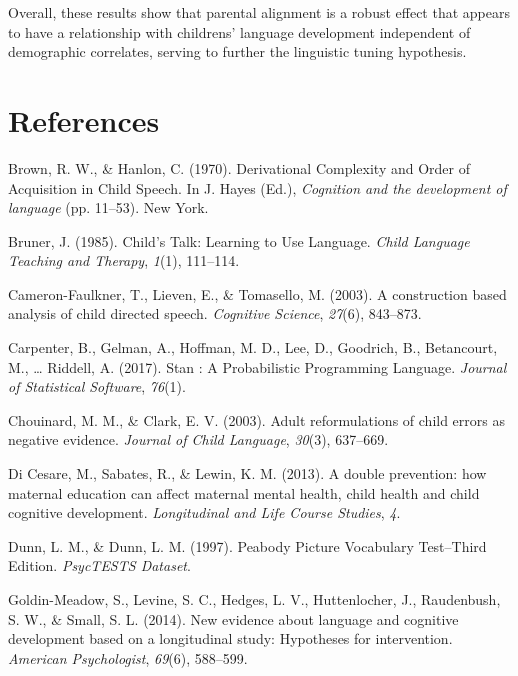 \documentclass[10pt, letterpaper]{article}
\begin{document}
Overall, these results show that parental alignment is a robust effect
that appears to have a relationship with childrens' language development
independent of demographic correlates, serving to further the linguistic
tuning hypothesis.

\hypertarget{references}{%
\section{References}\label{references}}

\setlength{\parindent}{-0.1in} 
\setlength{\leftskip}{0.125in}

\noindent

\hypertarget{refs}{}
\leavevmode\hypertarget{ref-Brown:1970wd}{}%
Brown, R. W., \& Hanlon, C. (1970). Derivational Complexity and Order of
Acquisition in Child Speech. In J. Hayes (Ed.), \emph{Cognition and the
development of language} (pp. 11--53). New York.

\leavevmode\hypertarget{ref-Bruner:1985if}{}%
Bruner, J. (1985). Child's Talk: Learning to Use Language. \emph{Child
Language Teaching and Therapy}, \emph{1}(1), 111--114.

\leavevmode\hypertarget{ref-CameronFaulkner:2003ge}{}%
Cameron-Faulkner, T., Lieven, E., \& Tomasello, M. (2003). A
construction based analysis of child directed speech. \emph{Cognitive
Science}, \emph{27}(6), 843--873.

\leavevmode\hypertarget{ref-Carpenter:2017ke}{}%
Carpenter, B., Gelman, A., Hoffman, M. D., Lee, D., Goodrich, B.,
Betancourt, M., \ldots{} Riddell, A. (2017). Stan : A Probabilistic
Programming Language. \emph{Journal of Statistical Software},
\emph{76}(1).

\leavevmode\hypertarget{ref-Chouinard:2003kq}{}%
Chouinard, M. M., \& Clark, E. V. (2003). Adult reformulations of child
errors as negative evidence. \emph{Journal of Child Language},
\emph{30}(3), 637--669.

\leavevmode\hypertarget{ref-DiCesare:2013ip}{}%
Di Cesare, M., Sabates, R., \& Lewin, K. M. (2013). A double prevention:
how maternal education can affect maternal mental health, child health
and child cognitive development. \emph{Longitudinal and Life Course
Studies}, \emph{4}.

\leavevmode\hypertarget{ref-PeabodyPictureVoca:im}{}%
Dunn, L. M., \& Dunn, L. M. (1997). Peabody Picture Vocabulary
Test--Third Edition. \emph{PsycTESTS Dataset}.

\leavevmode\hypertarget{ref-GoldinMeadow:2014hr}{}%
Goldin-Meadow, S., Levine, S. C., Hedges, L. V., Huttenlocher, J.,
Raudenbush, S. W., \& Small, S. L. (2014). New evidence about language
and cognitive development based on a longitudinal study: Hypotheses for
intervention. \emph{American Psychologist}, \emph{69}(6), 588--599.
\end{document}

